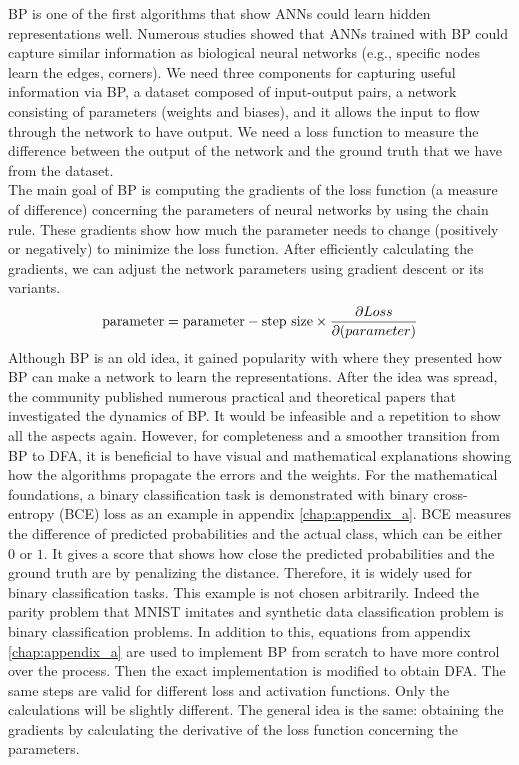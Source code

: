 \documentclass[a4paper, nobind]{templates/ociamthesis}
\begin{document}
BP is one of the first algorithms that show ANNs could learn hidden representations well. Numerous studies showed that ANNs trained with BP could capture similar information as biological neural networks (e.g., specific nodes learn the edges, corners). We need three components for capturing useful information via BP, a dataset composed of input-output pairs, a network consisting of parameters (weights and biases), and it allows the input to flow through the network to have output. We need a loss function to measure the difference between the output of the network and the ground truth that we have from the dataset.\\
The main goal of BP is computing the gradients of the loss function (a measure of difference) concerning the parameters of neural networks by using the chain rule. These gradients show how much the parameter needs to change (positively or negatively) to minimize the loss function. After efficiently calculating the gradients, we can adjust the network parameters using gradient descent or its variants.
\[
\begin{aligned} 
\text{parameter} &= \text{parameter} - \text{step size} \times \frac{\partial Loss}{\partial \text(parameter)}  \\
\end{aligned}
\]
\noindent Although BP is an old idea, it gained popularity with \cite{Rumelhart:1986we} where they presented how BP can make a network to learn the representations. After the idea was spread, the community published numerous practical and theoretical papers that investigated the dynamics of BP. It would be infeasible and a repetition to show all the aspects again. However, for completeness and a smoother transition from BP to DFA, it is beneficial to have visual and mathematical explanations showing how the algorithms propagate the errors and the weights. For the mathematical foundations, a binary classification task is demonstrated with binary cross-entropy (BCE) loss as an example in appendix \ref{chap:appendix_a}. BCE measures the difference of predicted probabilities and the actual class, which can be either \(0\) or \(1\). It gives a score that shows how close the predicted probabilities and the ground truth are by penalizing the distance. Therefore, it is widely used for binary classification tasks. This example is not chosen arbitrarily. Indeed the parity problem that MNIST imitates and synthetic data classification problem is binary classification problems. In addition to this, equations from appendix \ref{chap:appendix_a} are used to implement BP from scratch to have more control over the process. Then the exact implementation is modified to obtain DFA. The same steps are valid for different loss and activation functions. Only the calculations will be slightly different. The general idea is the same: obtaining the gradients by calculating the derivative of the loss function concerning the parameters.
\end{document}
